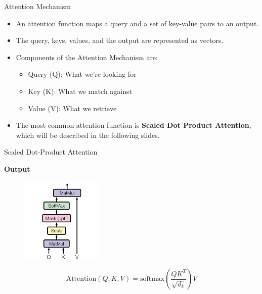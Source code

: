 \documentclass[serif, aspectratio=169]{beamer}
\begin{document}
\begin{frame}{Attention Mechanism}
	\begin{itemize}
		\item An attention function maps a query and a set of key-value pairs to an output.
		\item The query, keys, values, and the output are represented as vectors.
		\item Components of the Attention Mechanism are:
		    \begin{itemize}
			\item Query (Q): What we're looking for
			\item Key (K): What we match against
			\item Value (V): What we retrieve
			\end{itemize}
		\item The most common attention function is \textbf{Scaled Dot Product Attention}, which will be described in the following slides.
	\end{itemize}
\end{frame}

\begin{frame}{Scaled Dot-Product Attention}
	\vspace{-5pt}
	\begin{center}
		\textbf{Output}
	\end{center}
	\vspace{-5pt}
	\begin{figure}
		\centering
		\includegraphics[width=0.35\textwidth]{pic/Attention-s.png}
		\label{fig:attention-2}
	\end{figure}
	\vspace{-10pt}
	
	\[
	\text{Attention}(Q, K, V) = \text{softmax}\left(\frac{QK^T}{\sqrt{d_k}}\right)V
	\]
\end{frame}
\end{document}
